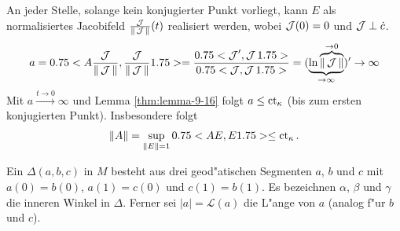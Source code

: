 An jeder Stelle, solange kein konjugierter Punkt vorliegt, kann $E$ als normalisiertes Jacobifeld $\frac{\operatorname{\mathcal{J}}}{\|\operatorname{\mathcal{J}}\|}(t)$ realisiert werden, wobei $\operatorname{\mathcal{J}}(0) = 0$ und $\operatorname{\mathcal{J}} \perp \dot c$.
\begin{align*}
  a = 0.75<A \frac{\operatorname{\mathcal{J}}}{\|\operatorname{\mathcal{J}}\|},\frac{\operatorname{\mathcal{J}}}{\|\operatorname{\mathcal{J}}\|}1.75>
  = \frac{0.75<\operatorname{\mathcal{J}}',\operatorname{\mathcal{J}}1.75>}{0.75<\operatorname{\mathcal{J}},\operatorname{\mathcal{J}}1.75>} = (\underbrace{\ln \overbrace{\|\operatorname{\mathcal{J}}\|}^{\to 0}}_{\to \infty})' \to \infty
\end{align*}
Mit $a \xrightarrow{t\to 0} \infty$ und Lemma \ref{thm:lemma-9-16} folgt $a \leq \operatorname{ct}_{\kappa}$ (bis zum ersten konjugierten Punkt).
Insbesondere folgt
\begin{align*}
  \|A\| = \sup_{\|E\| = 1} 0.75<AE,E1.75> \leq \operatorname{ct}_{\kappa}.
\end{align*}


\begin{dfn}
  Ein  $\Delta(a,b,c)$ in $M$ besteht aus drei geod"atischen Segmenten $a$, $b$ und $c$ mit $a(0) = b(0)$, $a(1) = c(0)$ und $c(1) = b(1)$.
  Es bezeichnen $\alpha$, $\beta$ und $\gamma$ die inneren Winkel in $\Delta$.
  Ferner sei $|a| = \mathcal L(a)$ die L"ange von $a$ (analog f"ur $b$ und $c$). 
  \begin{center}\end{center}
\end{dfn}

